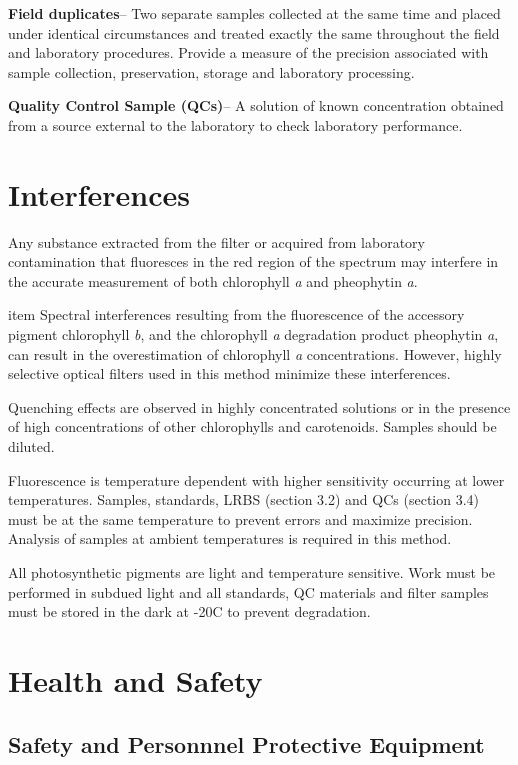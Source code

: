 \documentclass[12pt]{../SOP3_alpha}
\begin{document}
\NP \textbf{Field duplicates}-- Two separate samples collected at the same time and placed under identical circumstances and treated exactly the same throughout the field and laboratory procedures. Provide a measure of the precision associated with sample collection, preservation, storage and laboratory processing. 

\NP \textbf{Quality Control Sample (QCs)}-- A solution of known concentration obtained from a source external to the laboratory to check laboratory performance.  


\section{Interferences}
\NP Any substance extracted from the filter or acquired from laboratory contamination that fluoresces in the red region of the spectrum may interfere in the accurate measurement of both chlorophyll \textit{a} and pheophytin \textit{a}.

\NP item Spectral interferences resulting from the fluorescence of the accessory pigment chlorophyll \textit{b}, and the chlorophyll \textit{a} degradation product pheophytin \textit{a}, can result in the overestimation of chlorophyll \textit{a} concentrations. However, highly selective optical filters used in this method minimize these interferences.

\NP Quenching effects are observed in highly concentrated solutions or in the presence of high concentrations of other chlorophylls and carotenoids. Samples should be diluted.

\NP Fluorescence is temperature dependent with higher sensitivity occurring at lower temperatures. Samples, standards, LRBS (section 3.2) and QCs (section 3.4) must be at the same temperature to prevent errors and maximize precision. Analysis of samples at ambient temperatures is required in this method.

\NP All photosynthetic pigments are light and temperature sensitive. Work must be performed in subdued light and all standards, QC materials and filter samples must be stored in the dark at -20\degree C to prevent degradation.

\section{Health and Safety}

\subsection*{Safety and Personnnel Protective Equipment}
\end{document}

